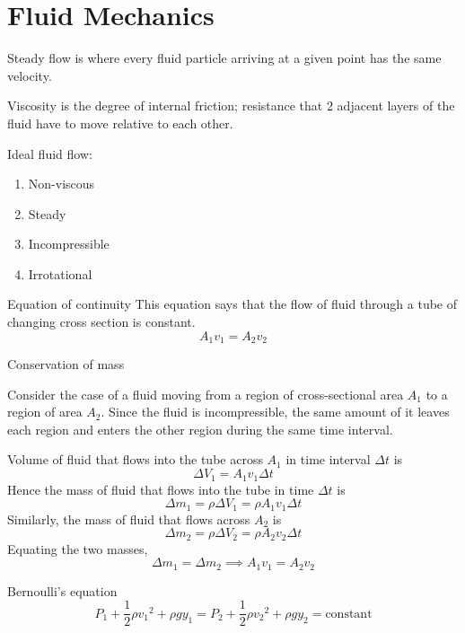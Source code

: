 \section{Fluid Mechanics}
Steady flow is where every fluid particle arriving at a given point has the same velocity.

Viscosity is the degree of internal friction; resistance that 2 adjacent layers of the fluid have to move relative to each other.

Ideal fluid flow:
\begin{enumerate}
    \item Non-viscous
    \item Steady
    \item Incompressible
    \item Irrotational
\end{enumerate}

\begin{thrm}{Equation of continuity}{}
This equation says that the flow of fluid through a tube of changing cross section is constant.
\begin{equation}
A_1 v_1 = A_2 v_2
\end{equation}
\end{thrm}

\begin{derivation}
Conservation of mass

Consider the case of a fluid moving from a region of cross-sectional area $A_1$ to a region of area $A_2$. Since the fluid is incompressible, the same amount of it leaves each region and enters the other region during the same time interval.

Volume of fluid that flows into the tube across $A_1$ in time interval $\Delta t$ is \[ \Delta V_1=A_1v_1\Delta t \] 
Hence the mass of fluid that flows into the tube in time $\Delta t$ is
\[ \Delta m_1 = \rho\Delta V_1 = \rho A_1v_1\Delta t \]
Similarly, the mass of fluid that flows across $A_2$ is
\[ \Delta m_2 = \rho\Delta V_2 = \rho A_2v_2\Delta t \]
Equating the two masses,
\[ \Delta m_1 = \Delta m_2 \implies \boxed{A_1v_1=A_2v_2} \]
\end{derivation}

\begin{thrm}{Bernoulli's equation}{}
\begin{equation}
P_1 + \frac{1}{2}\rho {v_1}^2 + \rho gy_1 = P_2 + \frac{1}{2}\rho {v_2}^2 + \rho gy_2 = \text{constant}
\end{equation}
\end{thrm}


